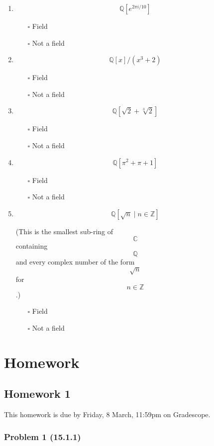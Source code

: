 \documentclass[11pt]{article}
\begin{document}
\begin{enumerate}
\item $$\mathbb{Q}[e^{2 \pi i / 10}]$$
\begin{itemize}
\item[{$\square$}] Field
\item[{$\square$}] Not a field
\end{itemize}
\item $$\mathbb{Q}[x]/(x^3+2)$$
\begin{itemize}
\item[{$\square$}] Field
\item[{$\square$}] Not a field
\end{itemize}
\item $$\mathbb{Q}[\sqrt 2 + \sqrt[3] 2 ]$$
\begin{itemize}
\item[{$\square$}] Field
\item[{$\square$}] Not a field
\end{itemize}
\item $$\mathbb{Q}[\pi^2 + \pi + 1]$$
\begin{itemize}
\item[{$\square$}] Field
\item[{$\square$}] Not a field
\end{itemize}
\item $$\mathbb{Q}[\sqrt n \mid n \in \mathbb{Z}]$$

(This is the smallest sub-ring of $$\mathbb{C}$$ containing $$\mathbb{Q}$$ and every complex number of the form $$\sqrt n$$ for $$n \in \mathbb{Z}$$.)

\begin{itemize}
\item[{$\square$}] Field
\item[{$\square$}] Not a field
\end{itemize}
\end{enumerate}
\section{Homework}
\label{sec:org885d312}
\subsection{Homework 1}
\label{sec:orgfe45ea5}
This homework is due by Friday, 8 March, 11:59pm on Gradescope.
\subsubsection{Problem 1 (15.1.1)}
\label{sec:org10bfb93}
\end{document}
